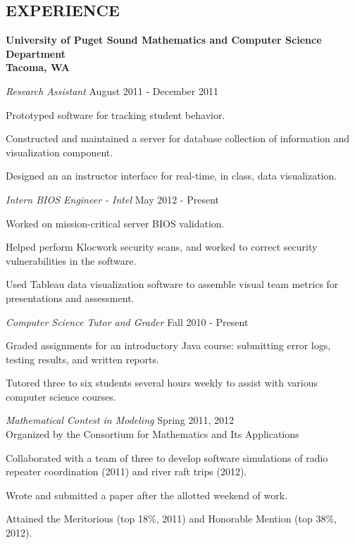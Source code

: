 \documentclass[line,margin,11pt]{res}
\newenvironment{itemize*}%
  {\begin{itemize}%
    \setlength{\parsep}{0pt}
    \setlength{\itemsep}{0pt}%
    \setlength{\parskip}{0pt}}%
  {\end{itemize}}
\begin{document}
\begin{resume}
\vspace*{.2cm} 

\section{EXPERIENCE} 
\textbf{University of Puget Sound
Mathematics and Computer Science Department\\
Tacoma, WA}

{\sl Research Assistant} \hfill August 2011 - December 2011
\begin{itemize*}
    \item Prototyped software for tracking student behavior.
    \item Constructed and maintained a server for database collection of 
      information and visualization component.
    \item Designed an an instructor interface for real-time, in class, data 
      visualization.
\end{itemize*}            

{\sl Intern BIOS Engineer - Intel} \hfill May 2012 - Present
\begin{itemize*}
    \item Worked on mission-critical server BIOS validation.
    \item Helped perform Klocwork security scans, and worked to correct security
        vulnerabilities in the software.
    \item Used Tableau data visualization software to assemble visual team 
        metrics for presentations and assessment.
\end{itemize*}            

{\sl Computer Science Tutor and Grader} \hfill Fall 2010 - Present
\begin{itemize*}  
    \item Graded assignments for an introductory Java course: submitting 
      error logs, testing results, and written reports.
    \item Tutored three to six students several hours weekly to assist with 
      various computer science courses.
\end{itemize*}

{\sl Mathematical Contest in Modeling} \hfill Spring 2011, 2012\\
Organized by the Consortium for Mathematics and Its Applications
\begin{itemize*}
\item Collaborated with a team of three to develop software 
  simulations of radio repeater coordination (2011) and river raft trips 
  (2012).
\item Wrote and submitted a paper after the allotted weekend of work.
\item Attained the Meritorious (top 18\%, 2011) and Honorable 
    Mention (top 38\%, 2012).
\end{itemize*}

\end{resume}
\end{document}

